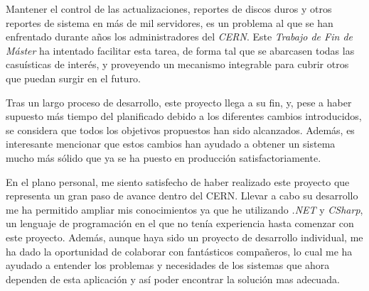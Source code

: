
    Mantener el control de las actualizaciones, reportes de discos duros y otros reportes de sistema en más de mil servidores, es un problema al que se han enfrentado durante años los administradores del \textit{CERN}. Este \textit{Trabajo de Fin de Máster} ha intentado facilitar esta tarea, de forma tal que se abarcasen todas las casuísticas de interés, y proveyendo un mecanismo integrable para cubrir otros que puedan surgir en el futuro.
    
    Tras un largo proceso de desarrollo, este proyecto llega a su fin, y, pese a haber supuesto más tiempo del planificado debido a los diferentes cambios introducidos, se considera que todos los objetivos propuestos han sido alcanzados. Además, es interesante mencionar que estos cambios han ayudado a obtener un sistema mucho más sólido que ya se ha puesto en producción satisfactoriamente.
    
    En el plano personal, me siento satisfecho de haber realizado este proyecto que representa un gran paso de avance dentro del CERN. Llevar a cabo su desarrollo me ha permitido ampliar mis conocimientos ya que he utilizando \textit{.NET} y \textit{CSharp}, un lenguaje de programación en el que no tenía experiencia  hasta comenzar con este proyecto. Además, aunque haya sido un proyecto de desarrollo individual, me ha dado la oportunidad de colaborar con fantásticos compañeros, lo cual me ha ayudado a entender los problemas y necesidades de los sistemas que ahora dependen de esta aplicación y así poder encontrar la solución mas adecuada.
